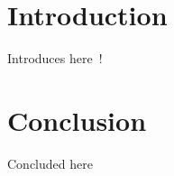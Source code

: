 \documentclass[10pt,conference]{IEEEtran}
\begin{document}
\maketitle

\begin{abstract}
ABSTRACT HERE! The code of the proposed method is available at \url{https://github.com/xxx/transferkan}.
\end{abstract}





\IEEEpeerreviewmaketitle



\section{Introduction}
\label{sec:intro}

Introduces here~\cite{queiroz2025deep}!


\section{Conclusion}
\label{sec:conclusion}

Concluded here

\end{document}

